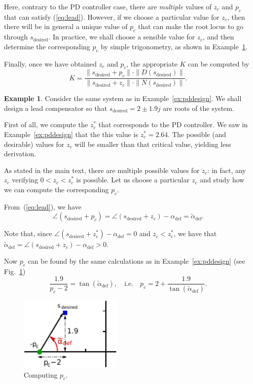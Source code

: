 \documentclass[a4paper,11pt]{report}
\theoremstyle{definition}
\newcommand{\des}{\textrm{desired}}
\newcommand{\defi}{\mathrm{def}}
\newtheorem{mdexample}{Example}
\newenvironment{example}%
  {\vspace{0.1cm}\begin{mdframed}[backgroundcolor=lightgray]\begin{mdexample}}%
  {\end{mdexample}\end{mdframed}\vspace{0.1cm}}
\begin{document}
Here, contrary to the PD controller case, there are \emph{multiple}
values of $z_c$ and $p_c$ that can satisfy (\ref{eq:lead}). However,
if we choose a particular value for $z_c$, then there will be in
general a unique value of $p_c$ that can make the root locus to go
through $s_\des$. In practice, we shall choose a sensible value for
$z_c$, and then determine the corresponding $p_c$ by simple
trigonometry, as shown in Example~\ref{ex:lead}.

Finally, once we have obtained $z_c$ and $p_c$, the appropriate $K$
can be computed by
\[
K = \frac{\|s_\des+p_c\|\cdot\|D(s_\des)\|}{\|s_\des+z_c\|\cdot\|N(s_\des)\|}.
\]

\begin{example}
  \label{ex:lead}
  Consider the same system as in Example~\ref{ex:pddesign}. We shall
  design a lead compensator so that $s_\des = 2\pm 1.9j$ are roots of
  the system.

  First of all, we compute the $z^*_c$ that corresponds to the PD
  controller. We saw in Example~\ref{ex:pddesign} that the this value
  is $z^*_c=2.64$. The possible (and desirable) values for $z_c$ will
  be smaller than that critical value, yielding less derivation.

  As stated in the main text, there are multiple possible values for
  $z_c$: in fact, any $z_c$ verifying $0<z_c<z^*_c$ is possible. Let
  us choose a particular $z_c$ and study how we can compute the
  corresponding $p_c$.

  From~(\ref{eq:lead}), we have
  \[
  \angle(s_\des+p_c) = \angle(s_\des+z_c)- \alpha_\defi =
  \tilde{\alpha}_\defi.
  \]
  
  Note that, since $\angle(s_\des+z^*_c)- \alpha_\defi=0$ and
  $z_c<z^*_c$, we have that $\tilde{\alpha}_\defi=\angle(s_\des+z_c)-
  \alpha_\defi>0$.

  Now $p_c$ can be found by the same calculations as in
  Example~\ref{ex:pddesign} (see Fig.~\ref{fig:pc})
  \begin{equation}
    \label{eq:pc}
    \frac{1.9}{p_c-2}=\tan(\tilde{\alpha}_\defi),\quad \textrm{i.e.}\quad p_c = 2
    + \frac{1.9}{\tan(\tilde{\alpha}_\defi)}.
  \end{equation}

  \begin{figure}[H]
    \centering
    \includegraphics[width=5cm]{fig/adef-lead.pdf}
    \caption{Computing $p_c$.}
    \label{fig:pc}
  \end{figure}


\end{example}
\end{document}
